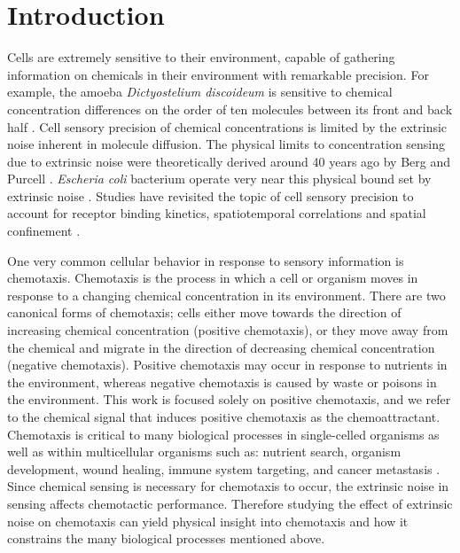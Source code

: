 
\chapter{Introduction}

\noindent
Cells are extremely sensitive to their environment, capable of gathering information on chemicals in their environment with remarkable precision. For example, the amoeba \textit{Dictyostelium discoideum} is sensitive to chemical concentration differences on the order of ten molecules between its front and back half \cite{song2006dictyostelium}. Cell sensory precision of chemical concentrations is limited by the extrinsic noise inherent in molecule diffusion. The physical limits to concentration sensing due to extrinsic noise were theoretically derived around 40 years ago by Berg and Purcell \cite{berg1977physics}. \textit{Escheria coli} bacterium operate very near this physical bound set by extrinsic noise \cite{lan2012energy}. Studies have revisited the topic of cell sensory precision to account for receptor binding kinetics, spatiotemporal correlations and spatial confinement
\cite{bialek2005physical, kaizu2014berg, bicknell2015limits}.

One very common cellular behavior in response to sensory information is chemotaxis. Chemotaxis is the process in which a cell or organism moves in response to a changing chemical concentration in its environment. There are two canonical forms of chemotaxis; cells either move towards the direction of increasing chemical concentration (positive chemotaxis), or they move away from the chemical and migrate in the direction of decreasing chemical concentration (negative chemotaxis). Positive chemotaxis may occur in response to nutrients in the environment, whereas negative chemotaxis is caused by waste or poisons in the environment.
This work is focused solely on positive chemotaxis, and we refer to the chemical signal that induces positive chemotaxis as the chemoattractant. Chemotaxis is critical to many biological processes in single-celled organisms as well as within multicellular organisms such as: nutrient search, organism development, wound healing, immune system targeting, and cancer metastasis \cite{iglesias2008navigating,roussos2011chemotaxis}. Since chemical sensing is necessary for chemotaxis to occur, the extrinsic noise in sensing affects chemotactic performance. Therefore studying the effect of extrinsic noise on chemotaxis can yield physical insight into chemotaxis and how it constrains the many biological processes mentioned above.

